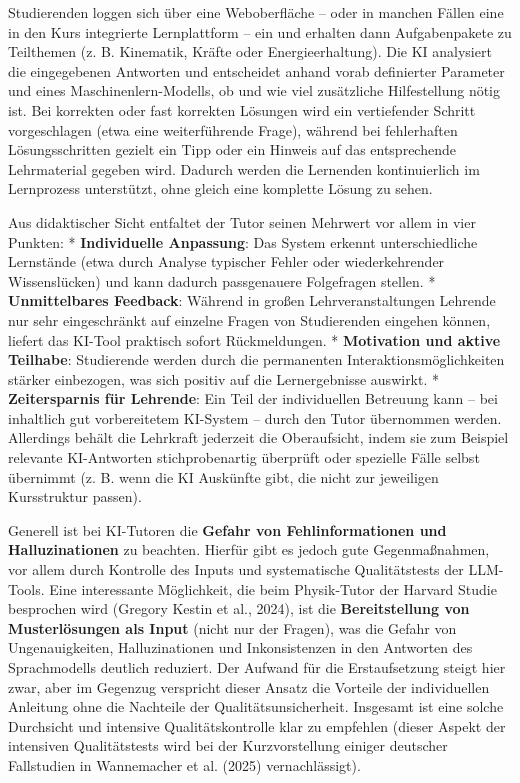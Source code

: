 \documentclass[
  ngerman,
  letterpaper,
  DIV=11]{scrreprt}
\begin{document}
Studierenden loggen sich über eine Weboberfläche -- oder in manchen
Fällen eine in den Kurs integrierte Lernplattform -- ein und erhalten
dann Aufgabenpakete zu Teilthemen (z. B. Kinematik, Kräfte oder
Energieerhaltung). Die KI analysiert die eingegebenen Antworten und
entscheidet anhand vorab definierter Parameter und eines
Maschinenlern-Modells, ob und wie viel zusätzliche Hilfestellung nötig
ist. Bei korrekten oder fast korrekten Lösungen wird ein vertiefender
Schritt vorgeschlagen (etwa eine weiterführende Frage), während bei
fehlerhaften Lösungsschritten gezielt ein Tipp oder ein Hinweis auf das
entsprechende Lehrmaterial gegeben wird. Dadurch werden die Lernenden
kontinuierlich im Lernprozess unterstützt, ohne gleich eine komplette
Lösung zu sehen.

Aus didaktischer Sicht entfaltet der Tutor seinen Mehrwert vor allem in
vier Punkten: * \textbf{Individuelle Anpassung}: Das System erkennt
unterschiedliche Lernstände (etwa durch Analyse typischer Fehler oder
wiederkehrender Wissenslücken) und kann dadurch passgenauere Folgefragen
stellen. * \textbf{Unmittelbares Feedback}: Während in großen
Lehrveranstaltungen Lehrende nur sehr eingeschränkt auf einzelne Fragen
von Studierenden eingehen können, liefert das KI-Tool praktisch sofort
Rückmeldungen. * \textbf{Motivation und aktive Teilhabe}: Studierende
werden durch die permanenten Interaktionsmöglichkeiten stärker
einbezogen, was sich positiv auf die Lernergebnisse auswirkt. *
\textbf{Zeitersparnis für Lehrende}: Ein Teil der individuellen
Betreuung kann -- bei inhaltlich gut vorbereitetem KI-System -- durch
den Tutor übernommen werden. Allerdings behält die Lehrkraft jederzeit
die Oberaufsicht, indem sie zum Beispiel relevante KI-Antworten
stichprobenartig überprüft oder spezielle Fälle selbst übernimmt (z. B.
wenn die KI Auskünfte gibt, die nicht zur jeweiligen Kursstruktur
passen).

Generell ist bei KI-Tutoren die \textbf{Gefahr von Fehlinformationen und
Halluzinationen} zu beachten. Hierfür gibt es jedoch gute
Gegenmaßnahmen, vor allem durch Kontrolle des Inputs und systematische
Qualitätstests der LLM-Tools. Eine interessante Möglichkeit, die beim
Physik-Tutor der Harvard Studie besprochen wird (Gregory Kestin et al.,
2024), ist die \textbf{Bereitstellung von Musterlösungen als Input}
(nicht nur der Fragen), was die Gefahr von Ungenauigkeiten,
Halluzinationen und Inkonsistenzen in den Antworten des Sprachmodells
deutlich reduziert. Der Aufwand für die Erstaufsetzung steigt hier zwar,
aber im Gegenzug verspricht dieser Ansatz die Vorteile der individuellen
Anleitung ohne die Nachteile der Qualitätsunsicherheit. Insgesamt ist
eine solche Durchsicht und intensive Qualitätskontrolle klar zu
empfehlen (dieser Aspekt der intensiven Qualitätstests wird bei der
Kurzvorstellung einiger deutscher Fallstudien in Wannemacher et al.
(2025) vernachlässigt).
\end{document}
